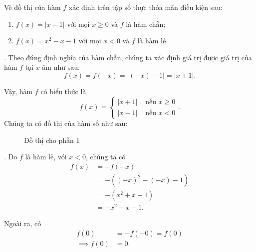 \exercise Vẽ đồ thị của hàm $f$ xác định trên tập số thực thỏa mãn điều kiện sau:
\begin{enumerate}
   \item $f(x) = |x - 1|$ với mọi $x \geq 0$ và $f$ là hàm chẵn;
   \item $f(x) = x^2 - x - 1$ với mọi $x < 0$ và $f$ là hàm lẻ.
\end{enumerate}

\solution

\setcounter{subexercise}{1}
. Theo đúng định nghĩa của hàm chẵn, chúng ta xác định giá trị được giá trị của hàm $f$ tại $x$ âm như sau:
$$
   f(x) = f(-x) = \left|(-x) - 1\right| = \left|x + 1\right|.
$$

Vậy, hàm $f$ có biểu thức là
$$
   f(x) = \begin{cases}
      |x + 1| & \text{ nếu } x \geq 0 \\
      |x - 1| & \text{ nếu } x < 0
   \end{cases}.
$$
Chúng ta có đồ thị của hàm số như sau:
\begin{figure}[H]
   \centering
   \caption{Đồ thị cho phần $1$}
\end{figure}

. Do $f$ là hàm lẻ, vói $x < 0$, chúng ta có
\begin{align*}
   f(x)  &= -f(-x) \\
         &= -\left((-x)^2 - (-x) - 1\right) \\
         &= -\left(x^2 + x - 1\right) \\
         &= -x^2 - x + 1.
\end{align*}

Ngoài ra, có
\begin{align*}
   f(0) &= -f(-0) = f(0) \\
   \implies f(0) &= 0.
\end{align*}

